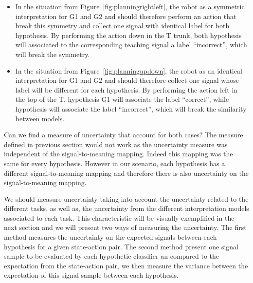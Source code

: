 \begin{itemize}
\item In the situation from Figure~\ref{fig:planningrightleft}, the robot as a symmetric interpretation for G1 and G2 and should therefore perform an action that break this symmetry and collect one signal with identical label for both hypothesis. By performing the action down in the T trunk, both hypothesis will associated to the corresponding teaching signal a label ``incorrect'', which will break the symmetry.
\item In the situation from Figure~\ref{fig:planningupdown}, the robot as an identical interpretation for G1 and G2 and should therefore collect one signal whose label will be different for each hypothesis. By performing the action left in the top of the T, hypothesis G1 will associate the label ``correct'', while hypothesis will associate the label ``incorrect'', which will break the similarity between models.
\end{itemize}

Can we find a measure of uncertainty that account for both cases? The measure defined in previous section would not work as the uncertainty measure was independent of the signal-to-meaning mapping. Indeed this mapping was the same for every hypothesis. However in our scenario, each hypothesis has a different signal-to-meaning mapping and therefore there is also uncertainty on the signal-to-meaning mapping.


We should measure uncertainty taking into account the uncertainty related to the different tasks, as well as, the uncertainty from the different interpretation models associated to each task. This characteristic will be visually exemplified in the next section and we will present two ways of measuring the uncertainty. The first method measures the uncertainty on the expected signals between each hypothesis for a given state-action pair. The second method present one signal sample to be evaluated by each hypothetic classifier an compared to the expectation from the state-action pair, we then measure the variance between the expectation of this signal sample between each hypothesis.


